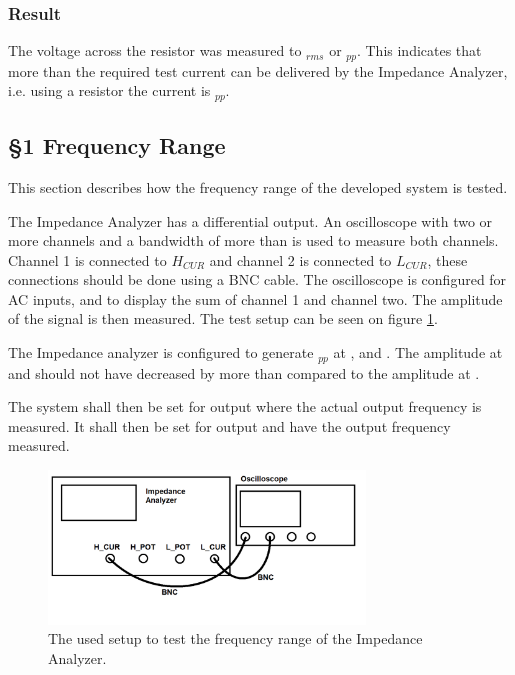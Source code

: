 \subsubsection*{Result}
The voltage across the resistor was measured to $_{rms}$ or $_{pp}$. This indicates that more than the required test current can be delivered by the Impedance Analyzer, i.e. using a  resistor the current is $_{pp}$.



\subsection{§1 Frequency Range} \label{subsec:BW_Test}
This section describes how the frequency range of the developed system is tested.

The Impedance Analyzer has a differential output. An oscilloscope with two or more channels and a bandwidth of more than  is used to measure both channels. Channel 1 is connected to $H_{CUR}$ and channel 2 is connected to $L_{CUR}$, these connections should be done using a BNC cable. The oscilloscope is configured for AC inputs, and to display the sum of channel 1 and channel two. The amplitude of the signal is then measured. The test setup can be seen on figure \ref{fig:App_BW_Test}.

The Impedance analyzer is configured to generate $_{pp}$ at ,  and . The amplitude at  and  should not have decreased by more than  compared to the amplitude at .

The system shall then be set for  output where the actual output frequency is measured. It shall then be set for  output and have the output frequency measured.

\begin{figure}[H]
    \centering
    \includegraphics[clip, trim=0 0 0 0, width=0.75\textwidth]{Appendix/Figures/BW_Test.pdf}
    \caption{The used setup to test the frequency range of the Impedance Analyzer.}
    \label{fig:App_BW_Test}
\end{figure}

